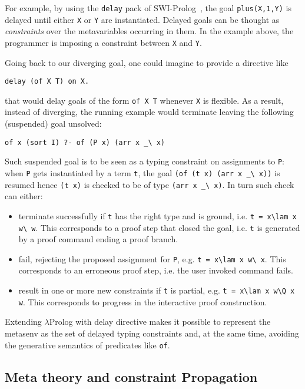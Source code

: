 \documentclass{easychair}
\begin{document}
For example, by using the \verb+delay+ pack of SWI-Prolog~\cite{SWI}, the goal
\verb+plus(X,1,Y)+ is delayed until either \verb+X+ or \verb+Y+ are
instantiated.  Delayed goals can be thought as \emph{constraints} over the
metavariables occurring in them. In the example above, the programmer is
imposing a constraint between \verb+X+ and \verb+Y+.

Going back to our diverging goal, one could imagine to provide a directive
like

\begin{verbatim}
delay (of X T) on X.
\end{verbatim}

that would delay goals of the form \verb+of X T+ whenever \verb+X+
is flexible.  As a result, instead of diverging, the running example
would terminate leaving the following (suspended) goal unsolved:

\begin{verbatim}
of x (sort I) ?- of (P x) (arr x _\ x)
\end{verbatim}

Such suspended goal is to be seen as a typing constraint on
assignments to \verb+P+: when \verb+P+ gets instantiated by a
term \verb+t+, the goal \verb+(of (t x) (arr x _\ x))+ is resumed
hence \verb+(t x)+ is checked to be of type \verb+(arr x _\ x)+.
In turn such check can either:
\begin{itemize}
\item terminate successfully if \verb+t+ has the right type and is ground,
	i.e. \verb+t = x\lam x w\ w+.  This corresponds to a proof step
	that closed the goal, i.e. \verb+t+ is generated by a
	proof command ending a proof branch.
\item fail, rejecting the proposed assignment for \verb+P+, e.g. 
	\verb+t = x\lam x w\ x+.  This corresponds to an erroneous proof step,
	i.e. the user invoked command fails.
\item result in one or more new constraints if \verb+t+ is partial,
	e.g. \verb+t = x\lam x w\Q x w+.  This corresponds to progress
	in the interactive proof construction.
\end{itemize}

Extending $\lambda$Prolog with delay directive makes it possible to represent
the metasenv as the set of delayed typing constraints and, at the same time,
avoiding the generative semantics of predicates like \verb+of+.

\subsection{Meta theory and constraint Propagation} %
\end{document}

